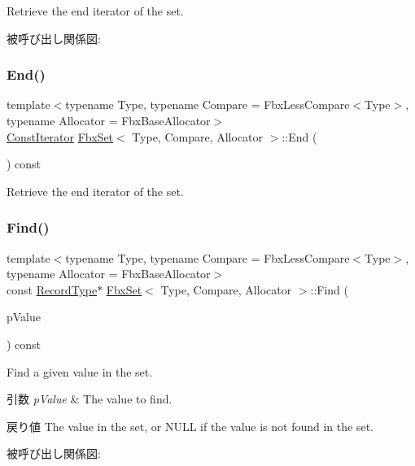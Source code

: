 Retrieve the end iterator of the set. 

被呼び出し関係図\+:
\mbox{\label{class_fbx_set_a2d12954434e697202a703cb574072e9d}} 
\subsubsection{\texorpdfstring{End()}{End()}\hspace{0.1cm}{\footnotesize\ttfamily [2/2]}}
{\footnotesize\ttfamily template$<$typename Type, typename Compare = Fbx\+Less\+Compare$<$\+Type$>$, typename Allocator = Fbx\+Base\+Allocator$>$ \\
\hyperlink{class_fbx_set_af9aee2f7b6a6638b816ea95bd510928c}{Const\+Iterator} \hyperlink{class_fbx_set}{Fbx\+Set}$<$ Type, Compare, Allocator $>$\+::End (\begin{DoxyParamCaption}{ }\end{DoxyParamCaption}) const}



Retrieve the end iterator of the set. 

\mbox{\label{class_fbx_set_a49f1d5af6cdfb5a27af1624c7c2463ae}} 
\subsubsection{\texorpdfstring{Find()}{Find()}\hspace{0.1cm}{\footnotesize\ttfamily [1/2]}}
{\footnotesize\ttfamily template$<$typename Type, typename Compare = Fbx\+Less\+Compare$<$\+Type$>$, typename Allocator = Fbx\+Base\+Allocator$>$ \\
const \hyperlink{class_fbx_set_aa3934cd434a09288204f5e6c99b9cd01}{Record\+Type}$\ast$ \hyperlink{class_fbx_set}{Fbx\+Set}$<$ Type, Compare, Allocator $>$\+::Find (\begin{DoxyParamCaption}\item[{const \hyperlink{class_fbx_set_abb0f1b628634e07825532526e2e92baf}{Value\+Type} \&}]{p\+Value }\end{DoxyParamCaption}) const}

Find a given value in the set. 
\begin{DoxyParams}{引数}
{\em p\+Value} & The value to find. \\
\hline
\end{DoxyParams}
\begin{DoxyReturn}{戻り値}
The value in the set, or N\+U\+LL if the value is not found in the set. 
\end{DoxyReturn}
被呼び出し関係図\+:
\mbox{\label{class_fbx_set_ac5bd4cb3958389b323d8375b5b17958f}} 
